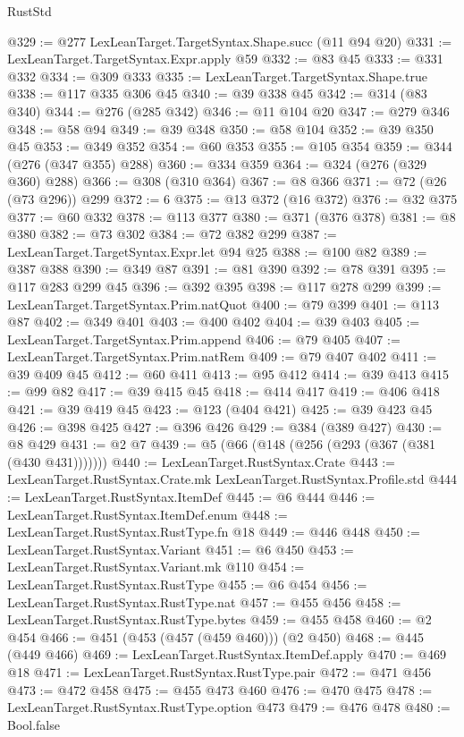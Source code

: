 \begin{lexlean}{RustStd}
\begin{coremodule}
@329 := @277 LexLeanTarget.TargetSyntax.Shape.succ (@11 @94 @20)
@331 := LexLeanTarget.TargetSyntax.Expr.apply @59
@332 := @83 @45
@333 := @331 @332
@334 := @309 @333
@335 := LexLeanTarget.TargetSyntax.Shape.true
@338 := @117 @335 @306 @45
@340 := @39 @338 @45
@342 := @314 (@83 @340)
@344 := @276 (@285 @342)
@346 := @11 @104 @20
@347 := @279 @346
@348 := @58 @94
@349 := @39 @348
@350 := @58 @104
@352 := @39 @350 @45
@353 := @349 @352
@354 := @60 @353
@355 := @105 @354
@359 := @344 (@276 (@347 @355) @288)
@360 := @334 @359
@364 := @324 (@276 (@329 @360) @288)
@366 := @308 (@310 @364)
@367 := @8 @366
@371 := @72 (@26 (@73 @296)) @299
@372 := 6
@375 := @13 @372 (@16 @372)
@376 := @32 @375
@377 := @60 @332
@378 := @113 @377
@380 := @371 (@376 @378)
@381 := @8 @380
@382 := @73 @302
@384 := @72 @382 @299
@387 := LexLeanTarget.TargetSyntax.Expr.let @94 @25
@388 := @100 @82
@389 := @387 @388
@390 := @349 @87
@391 := @81 @390
@392 := @78 @391
@395 := @117 @283 @299 @45
@396 := @392 @395
@398 := @117 @278 @299
@399 := LexLeanTarget.TargetSyntax.Prim.natQuot
@400 := @79 @399
@401 := @113 @87
@402 := @349 @401
@403 := @400 @402
@404 := @39 @403
@405 := LexLeanTarget.TargetSyntax.Prim.append
@406 := @79 @405
@407 := LexLeanTarget.TargetSyntax.Prim.natRem
@409 := @79 @407 @402
@411 := @39 @409 @45
@412 := @60 @411
@413 := @95 @412
@414 := @39 @413
@415 := @99 @82
@417 := @39 @415 @45
@418 := @414 @417
@419 := @406 @418
@421 := @39 @419 @45
@423 := @123 (@404 @421)
@425 := @39 @423 @45
@426 := @398 @425
@427 := @396 @426
@429 := @384 (@389 @427)
@430 := @8 @429
@431 := @2 @7
@439 := @5 (@66 (@148 (@256 (@293 (@367 (@381 (@430 @431)))))))
@440 := LexLeanTarget.RustSyntax.Crate
@443 := LexLeanTarget.RustSyntax.Crate.mk LexLeanTarget.RustSyntax.Profile.std
@444 := LexLeanTarget.RustSyntax.ItemDef
@445 := @6 @444
@446 := LexLeanTarget.RustSyntax.ItemDef.enum
@448 := LexLeanTarget.RustSyntax.RustType.fn @18
@449 := @446 @448
@450 := LexLeanTarget.RustSyntax.Variant
@451 := @6 @450
@453 := LexLeanTarget.RustSyntax.Variant.mk @110
@454 := LexLeanTarget.RustSyntax.RustType
@455 := @6 @454
@456 := LexLeanTarget.RustSyntax.RustType.nat
@457 := @455 @456
@458 := LexLeanTarget.RustSyntax.RustType.bytes
@459 := @455 @458
@460 := @2 @454
@466 := @451 (@453 (@457 (@459 @460))) (@2 @450)
@468 := @445 (@449 @466)
@469 := LexLeanTarget.RustSyntax.ItemDef.apply
@470 := @469 @18
@471 := LexLeanTarget.RustSyntax.RustType.pair
@472 := @471 @456
@473 := @472 @458
@475 := @455 @473 @460
@476 := @470 @475
@478 := LexLeanTarget.RustSyntax.RustType.option @473
@479 := @476 @478
@480 := Bool.false

\end{coremodule}
\end{lexlean}
